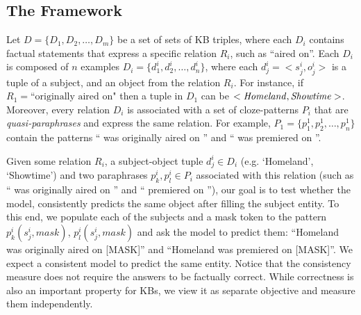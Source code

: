 \subsection{The Framework}
\label{sec:framework}
Let
$D = \{D_1, D_2,
\dots, D_m\}$
be a set of sets of KB triples,
where each $D_i$ contains factual statements
that express a specific relation $R_i$, such as ``aired
on''. Each $D_i$ is composed of $n$ examples $D_i = \{d_1^i,
d_2^i, \dots, d_n^i\}$, where each $d_j^i = <s_j^i,o_j^i>$ is a tuple of a subject, and an object from the relation $R_i$. 
For instance, if $R_1=\text{``originally
  aired on"}$ then a tuple in $D_1$ can be $<\text{\textit{Homeland}}, \text{\textit{Showtime}}>$. Moreover, every relation $D_i$  is associated with a set of cloze-patterns $P_i$ that are \textit{quasi-paraphrases} and express the same relation. For example, $P_1=\{p_1^1, p_2^1, \dots, p_n^1\}$ contain the patterns ``\subj{} was originally aired on \obj{}'' and ``\subj{} was premiered on \obj{}''.

Given some relation $R_i$, a subject-object tuple $d_j^i \in D_i$ (e.g. `Homeland', `Showtime') and two paraphrases $p_k^i, p_l^i \in P_i$ associated with this relation (such as ``\subj{} was originally aired on \obj{}'' and ``\subj{} premiered on \obj{}''), our goal is to test whether the model, consistently predicts the same object after filling the subject entity. To this end, we populate each of the subjects and a mask token to the pattern $p_k^i(s_j^i,mask)$, $p_l^i(s_j^i,mask)$
and ask the model to predict them: ``Homeland was originally aired on [MASK]'' and ``Homeland was premiered on [MASK]''.  We expect a consistent model to predict the same entity. Notice that the consistency measure does not require the answers to be factually correct. While correctness is also an important property for KBs, we view it as separate objective and measure them independently. 


